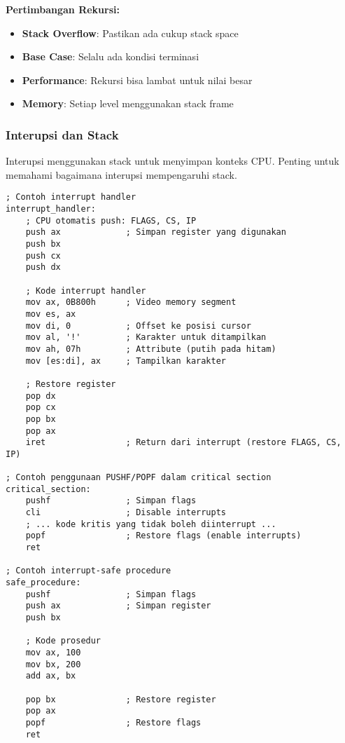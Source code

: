 \documentclass[../main.tex]{subfiles}
\begin{document}
                \textbf{Pertimbangan Rekursi:}
                \begin{itemize}
                    \item \textbf{Stack Overflow}: Pastikan ada cukup stack space
                    \item \textbf{Base Case}: Selalu ada kondisi terminasi
                    \item \textbf{Performance}: Rekursi bisa lambat untuk nilai besar
                    \item \textbf{Memory}: Setiap level menggunakan stack frame
                \end{itemize}

            \subsubsection{Interupsi dan Stack}
                Interupsi menggunakan stack untuk menyimpan konteks CPU. Penting untuk memahami bagaimana interupsi mempengaruhi stack.

                \begin{lstlisting}[language={[x86masm]Assembler}, caption=Interupsi dan Stack, label={lst:interrupt-stack}]
; Contoh interrupt handler
interrupt_handler:
    ; CPU otomatis push: FLAGS, CS, IP
    push ax             ; Simpan register yang digunakan
    push bx
    push cx
    push dx
    
    ; Kode interrupt handler
    mov ax, 0B800h      ; Video memory segment
    mov es, ax
    mov di, 0           ; Offset ke posisi cursor
    mov al, '!'         ; Karakter untuk ditampilkan
    mov ah, 07h         ; Attribute (putih pada hitam)
    mov [es:di], ax     ; Tampilkan karakter
    
    ; Restore register
    pop dx
    pop cx
    pop bx
    pop ax
    iret                ; Return dari interrupt (restore FLAGS, CS, IP)

; Contoh penggunaan PUSHF/POPF dalam critical section
critical_section:
    pushf               ; Simpan flags
    cli                 ; Disable interrupts
    ; ... kode kritis yang tidak boleh diinterrupt ...
    popf                ; Restore flags (enable interrupts)
    ret

; Contoh interrupt-safe procedure
safe_procedure:
    pushf               ; Simpan flags
    push ax             ; Simpan register
    push bx
    
    ; Kode prosedur
    mov ax, 100
    mov bx, 200
    add ax, bx
    
    pop bx              ; Restore register
    pop ax
    popf                ; Restore flags
    ret
                \end{lstlisting}
\end{document}
